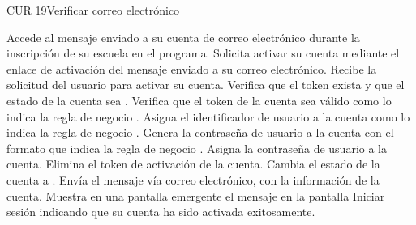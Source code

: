 \begin{UseCase}{CUR 19}{Verificar correo electrónico}
		

\end{UseCase}

 \begin{UCtrayectoria}
   \UCpaso[\UCactor] Accede al mensaje  enviado a su cuenta de correo electrónico durante la inscripción de su escuela en el programa.
    \UCpaso[\UCactor] Solicita activar su cuenta mediante el enlace de activación del mensaje  enviado a su correo electrónico.
    \UCpaso[\UCsist] Recibe la solicitud del usuario para activar su cuenta.
    \UCpaso[\UCsist] Verifica que el token exista y que el estado de la cuenta sea . 
    \UCpaso[\UCsist] Verifica que el token de la cuenta sea válido como lo indica la regla de negocio . 
    \UCpaso[\UCsist] Asigna el identificador de usuario a la cuenta como lo indica la regla de negocio .
    \UCpaso[\UCsist] Genera la contraseña de usuario a la cuenta con el formato que indica la regla de negocio .
    \UCpaso[\UCsist] Asigna la contraseña de usuario a la cuenta.
    \UCpaso[\UCsist] Elimina el token de activación de la cuenta.
    \UCpaso[\UCsist] Cambia el estado de la cuenta a .
    \UCpaso[\UCsist] Envía el mensaje  vía correo electrónico, con la información de la cuenta. 
    \UCpaso[\UCsist] Muestra en una pantalla emergente el mensaje  en la pantalla  {Iniciar sesión} indicando que su cuenta ha sido activada exitosamente.
 \end{UCtrayectoria}
 
